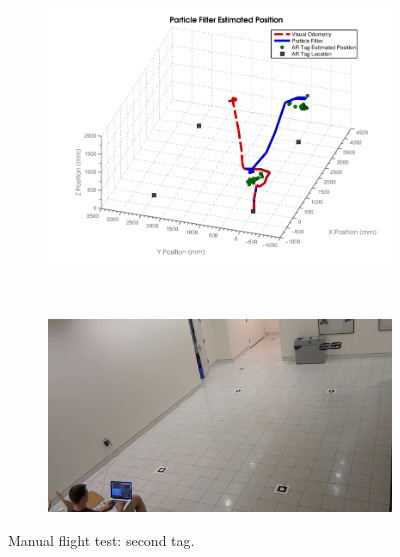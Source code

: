 	\begin{figure}[ht]
	        \centering
	        \begin{subfigure}[b]{0.75\textwidth}
	                \centering
	                \includegraphics[width=\textwidth]{../images/3dgraph_48.png}
	                \label{fig:tag2}
	        \end{subfigure}%
	        \\
	        \begin{subfigure}[b]{0.75\textwidth}
	                \centering
	                \includegraphics[width=\textwidth]{../images/frame2.png}
	                \label{fig:frame2}
	        \end{subfigure}
	        \caption{Manual flight test: second tag.}
	\end{figure}

